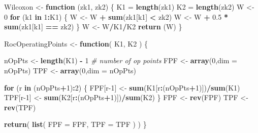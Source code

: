 \documentclass[
]{book}
\newenvironment{Shaded}{\begin{snugshade}}{\end{snugshade}}
\newcommand{\CommentTok}[1]{\textcolor[rgb]{0.56,0.35,0.01}{\textit{#1}}}
\newcommand{\ControlFlowTok}[1]{\textcolor[rgb]{0.13,0.29,0.53}{\textbf{#1}}}
\newcommand{\DataTypeTok}[1]{\textcolor[rgb]{0.13,0.29,0.53}{#1}}
\newcommand{\DecValTok}[1]{\textcolor[rgb]{0.00,0.00,0.81}{#1}}
\newcommand{\FloatTok}[1]{\textcolor[rgb]{0.00,0.00,0.81}{#1}}
\newcommand{\KeywordTok}[1]{\textcolor[rgb]{0.13,0.29,0.53}{\textbf{#1}}}
\newcommand{\NormalTok}[1]{#1}
\newcommand{\OperatorTok}[1]{\textcolor[rgb]{0.81,0.36,0.00}{\textbf{#1}}}
\newcommand{\StringTok}[1]{\textcolor[rgb]{0.31,0.60,0.02}{#1}}
\begin{document}
\begin{Shaded}
\begin{Highlighting}[]
\NormalTok{Wilcoxon \textless{}{-}}\StringTok{ }\ControlFlowTok{function}\NormalTok{ (zk1, zk2)}
\NormalTok{\{}
\NormalTok{  K1 =}\StringTok{ }\KeywordTok{length}\NormalTok{(zk1)}
\NormalTok{  K2 =}\StringTok{ }\KeywordTok{length}\NormalTok{(zk2)}
\NormalTok{  W \textless{}{-}}\StringTok{ }\DecValTok{0}
  \ControlFlowTok{for}\NormalTok{ (k1 }\ControlFlowTok{in} \DecValTok{1}\OperatorTok{:}\NormalTok{K1) \{}
\NormalTok{    W \textless{}{-}}\StringTok{ }\NormalTok{W }\OperatorTok{+}\StringTok{ }\KeywordTok{sum}\NormalTok{(zk1[k1] }\OperatorTok{\textless{}}\StringTok{ }\NormalTok{zk2)}
\NormalTok{    W \textless{}{-}}\StringTok{ }\NormalTok{W }\OperatorTok{+}\StringTok{ }\FloatTok{0.5} \OperatorTok{*}\StringTok{ }\KeywordTok{sum}\NormalTok{(zk1[k1] }\OperatorTok{==}\StringTok{ }\NormalTok{zk2)}
\NormalTok{  \}}
\NormalTok{  W \textless{}{-}}\StringTok{ }\NormalTok{W}\OperatorTok{/}\NormalTok{K1}\OperatorTok{/}\NormalTok{K2}
  \KeywordTok{return}\NormalTok{ (W)}
\NormalTok{\}}

\NormalTok{RocOperatingPoints \textless{}{-}}\StringTok{ }\ControlFlowTok{function}\NormalTok{( K1, K2 ) \{}
  
\NormalTok{  nOpPts \textless{}{-}}\StringTok{ }\KeywordTok{length}\NormalTok{(K1) }\OperatorTok{{-}}\StringTok{ }\DecValTok{1} \CommentTok{\# number of op points}
\NormalTok{  FPF \textless{}{-}}\StringTok{ }\KeywordTok{array}\NormalTok{(}\DecValTok{0}\NormalTok{,}\DataTypeTok{dim =}\NormalTok{ nOpPts)}
\NormalTok{  TPF \textless{}{-}}\StringTok{ }\KeywordTok{array}\NormalTok{(}\DecValTok{0}\NormalTok{,}\DataTypeTok{dim =}\NormalTok{ nOpPts)}
   
  \ControlFlowTok{for}\NormalTok{ (r }\ControlFlowTok{in}\NormalTok{ (nOpPts}\OperatorTok{+}\DecValTok{1}\NormalTok{)}\OperatorTok{:}\DecValTok{2}\NormalTok{) \{}
\NormalTok{    FPF[r}\DecValTok{{-}1}\NormalTok{] \textless{}{-}}\StringTok{ }\KeywordTok{sum}\NormalTok{(K1[r}\OperatorTok{:}\NormalTok{(nOpPts}\OperatorTok{+}\DecValTok{1}\NormalTok{)])}\OperatorTok{/}\KeywordTok{sum}\NormalTok{(K1)}
\NormalTok{    TPF[r}\DecValTok{{-}1}\NormalTok{] \textless{}{-}}\StringTok{ }\KeywordTok{sum}\NormalTok{(K2[r}\OperatorTok{:}\NormalTok{(nOpPts}\OperatorTok{+}\DecValTok{1}\NormalTok{)])}\OperatorTok{/}\KeywordTok{sum}\NormalTok{(K2)    }
\NormalTok{  \}}
\NormalTok{  FPF \textless{}{-}}\StringTok{ }\KeywordTok{rev}\NormalTok{(FPF)}
\NormalTok{  TPF \textless{}{-}}\StringTok{ }\KeywordTok{rev}\NormalTok{(TPF)}
  
  \KeywordTok{return}\NormalTok{( }\KeywordTok{list}\NormalTok{(}
    \DataTypeTok{FPF =}\NormalTok{ FPF,}
    \DataTypeTok{TPF =}\NormalTok{ TPF}
\NormalTok{  ) )}
\NormalTok{\}}
\end{Highlighting}
\end{Shaded}
\end{document}
